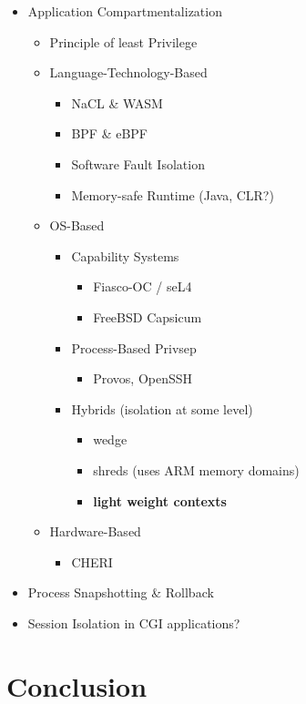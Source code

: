\documentclass[10pt,twocolumn,letter]{article}
\begin{document}
\begin{itemize}
  \item Application Compartmentalization
  \begin{itemize}
    \item Principle of least Privilege
    
    \item Language-Technology-Based
    \begin{itemize}
      \item NaCL \& WASM
      \item BPF \& eBPF
      \item Software Fault Isolation
      \item Memory-safe Runtime (Java, CLR?) %
    \end{itemize}
    
    \item OS-Based
      \begin{itemize}
        \item Capability Systems
        \begin{itemize}
          \item Fiasco-OC / seL4
          \item FreeBSD Capsicum
        \end{itemize}
        \item Process-Based Privsep
        \begin{itemize}
          \item Provos, OpenSSH
        \end{itemize}
        \item Hybrids (isolation at some level)
        \begin{itemize}
          \item wedge
          \item shreds (uses ARM memory domains)
          \item \textbf{light weight contexts}
        \end{itemize}
      \end{itemize}

    \item Hardware-Based
    \begin{itemize}
      \item CHERI
    \end{itemize}
  \end{itemize}
  
  \item Process Snapshotting \& Rollback
  \item Session Isolation in CGI applications?
\end{itemize}

\section{Conclusion}\label{conclusion}

\nocite{*}
\clearpage
\printbibliography
\end{document}
